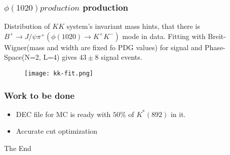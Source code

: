 \documentclass{beamer}
\begin{document}
\begin{frame}
\frametitle{$\phi(1020) production$ production}
Distribution of $KK$ system's invariant mass hints, that there is $B^{+} \to J/\psi \pi^+ (\phi(1020) \to K^+ K^-)$ mode in data. 
Fitting with Breit-Wigner(mass and width are fixed fo PDG values) for signal and Phase-Space(N=2, L=4) gives $43 \pm 8$ signal events.
\begin{figure}
\texttt{[image: kk-fit.png]}
\end{figure}
\end{frame}




\begin{frame}
\frametitle{Work to be done}
\begin{itemize}
\item DEC file for MC is ready with $50\%$ of $K^{*}(892)$ in it.
\item Accurate cut optimization
\end{itemize}
\end{frame}


\begin{frame}
\Huge{\centerline{The End}}
\end{frame}

\end{document}
